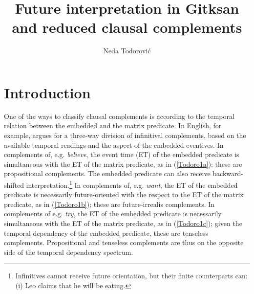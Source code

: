 \documentclass[output=paper]{langscibook}
\author{Neda Todorović\affiliation{University of British Columbia}}
\title{Future interpretation in Gitksan and reduced clausal complements}
\begin{document}
\newcommand{\tsc}{\textsc}
\newcommand{\CP}{\textsc{cp}}
\newcommand{\tp}{\textsc{tp}}
\newcommand{\aspp}{\textsc{aspp}}
\newcommand{\vp}{\textsc{vp}}
\newcommand{\MOD}{\textsc{mod}}
\newcommand{\woll}{\textsc{woll}}
\newcommand{\dn}{\textsc{dn}}
\newcommand{\cn}{\textsc{cn}}
\newcommand{\pn}{\textsc{pn}}
\newcommand{\seriesI}{\textsc{i}}
\newcommand{\seriesII}{\textsc{ii}}
\newcommand{\seriesIII}{\textsc{iii}}
\newcommand{\irr}{\textsc{irr}}
\newcommand{\glossNeg}{\textsc{neg}}
\newcommand{\foc}{\textsc{foc}}
\newcommand{\prog}{\textsc{prog}}
\newcommand{\sg}{\textsc{sg}}
\newcommand{\tr}{\textsc{tr}}
\newcommand{\sx}{\textsc{sx}}
\newcommand{\ax}{\textsc{ax}}
\newcommand{\pl}{\textsc{pl}}
\newcommand{\indp}{\textsc{indp}}
\newcommand{\comp}{\textsc{comp}}
\newcommand{\pass}{\textsc{pass}}
\maketitle

\section{Introduction}\label{Todoro:sect1}
One of the ways to classify clausal complements is according to the temporal relation between the embedded and the matrix predicate. 
In English, for example, \citet{wurmbrand2014a} argues for a three-way division of  infinitival complements, based on the available temporal readings and the aspect of the embedded eventives. In complements of, e.g. \emph{believe}, the event time (ET) of the embedded predicate is simultaneous with the ET of the matrix predicate, as in (\ref{Todoro1a}); these are propositional complements. The embedded predicate can also receive backward-shifted interpretation.\footnote{Infinitives cannot receive future orientation, but their finite counterparts can: \\
(i)	Leo claims that he will be eating. } In complements of, e.g. \emph{want}, the ET of the embedded predicate is necessarily future-oriented with the respect to the ET of the matrix predicate, as in (\ref{Todoro1b}); these are future-irrealis complements. In complements of e.g. \emph{try}, the ET of the embedded predicate is necessarily simultaneous with the ET of the matrix predicate, as in (\ref{Todoro1c}); given the temporal dependency of the embedded predicate, these are tenseless complements. Propositional and tenseless complements are thus on the opposite side of the temporal dependency spectrum. 
\end{document}

